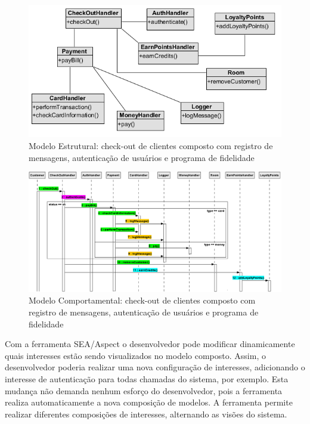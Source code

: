   \begin{figure}[!h]
	\centering
	\includegraphics[scale=0.7]{img/case_study_2_compound_structural.png}
	\caption{Modelo Estrutural: check-out de clientes composto com registro de mensagens, autenticação de usuários e programa de
	fidelidade}\label{fig:case_study_2_compound_structural}
  \end{figure}

  \begin{landscape}
  \begin{figure}[tb]
	\centering
	\includegraphics[scale=0.5]{img/case_study_2_compound.png}
	\caption{Modelo Comportamental: check-out de clientes composto com registro de mensagens, autenticação de usuários e programa de
	fidelidade}\label{fig:case_study_2_compound}
  \end{figure}
\end{landscape}

Com a ferramenta SEA/Aspect o desenvolvedor pode modificar dinamicamente quais interesses estão sendo visualizados no modelo composto. Assim, o
desenvolvedor poderia realizar uma nova configuração de interesses, adicionando o interesse de autenticação para todas chamadas do sistema, por
exemplo. Esta mudança não demanda nenhum esforço do desenvolvedor, pois a ferramenta realiza automaticamente a nova composição de modelos. A
ferramenta permite realizar diferentes composições de interesses, alternando as visões do sistema.


